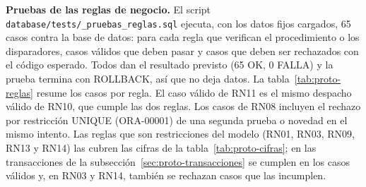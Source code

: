 \begin{sloppypar}
\textbf{Pruebas de las reglas de negocio.} El script
\texttt{database/tests/\_pruebas\_reglas.sql} ejecuta, con los datos
fijos cargados, 65 casos contra la base de datos: para cada regla que
verifican el procedimiento o los disparadores, casos válidos que deben
pasar y casos que deben ser rechazados con el código esperado. Todos
dan el resultado previsto (65 OK, 0 FALLA) y la prueba termina con
ROLLBACK, así que no deja datos. La tabla~\ref{tab:proto-reglas} resume
los casos por regla. El caso válido de RN11 es el mismo despacho válido
de RN10, que cumple las dos reglas. Los casos de RN08 incluyen el
rechazo por restricción UNIQUE (ORA-00001) de una segunda prueba o
novedad en el mismo intento. Las reglas que son restricciones del modelo
(RN01, RN03, RN09, RN13 y RN14) las cubren las cifras de la
tabla~\ref{tab:proto-cifras}; en las transacciones de la
subsección~\ref{sec:proto-transacciones} se cumplen en los casos válidos
y, en RN03 y RN14, también se rechazan casos que las incumplen.
\end{sloppypar}

